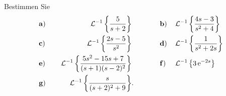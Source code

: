 {
Bestimmen Sie
\begin{align*}
&\text{\textbf a)}&&\, &\mathcal{L}^{-1}\left\{ \frac 5{s+2}\right\}&
\qquad\qquad\text{\textbf b)}& \, &\mathcal{L}^{-1}\left\{\frac {4s-3}{s^2+4}\right\}\\
&\text{\textbf c)}&&\, &\mathcal{L}^{-1}\left\{ \frac {2s-5}{s^2}\right\}&
\qquad\qquad\text{\textbf d)}& \, &\mathcal{L}^{-1}\left\{ \frac 1{s^2+2s}\right\}\\
&\text{\textbf e)}&&\, &\mathcal{L}^{-1}\left\{\frac {5s^2-15s+7}{(s+1)(s-2)^2}\right\}&
\qquad\qquad\text{\textbf f)}&\, &\mathcal{L}^{-1}\left\{3\operatorname{e}^{-2s}\right\}\\
&\text{\textbf g)}&&\, &\mathcal{L}^{-1}\left\{ \frac{s}{(s+2)^2+9}\right\}&.
\end{align*}
}

